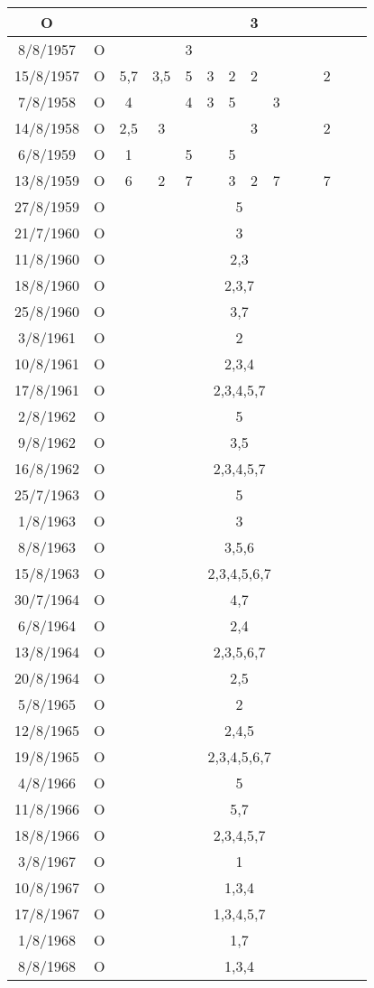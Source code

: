 \begin{longtable}{|c|c|c|c|c|c|c|c|c|c|c|c|c|c|}
	O &
	& & & & & & 3 & & & & &
	\tabularnewline
\hline
	8/8/1957	&
	O &
	& & 3 & & & & & & & & &
	\tabularnewline
\hline
	15/8/1957	 &
	O &
	5,7 & 3,5 & 5 & 3 & 2 & 2 & & & & 2 & &
	\tabularnewline
\hline
	7/8/1958	&
	O &
	4 & & 4 & 3 & 5 & & 3 & & & & &
	\tabularnewline
\hline
	14/8/1958	 &
	O &
	2,5 & 3 & & & & 3 & & & & 2 & &
	\tabularnewline
\hline
	6/8/1959	&
	O &
	1 & & 5 & & 5 & & & & & & &
	\tabularnewline
\hline
	13/8/1959	 &
	O &
	6 & 2 & 7 & & 3 & 2 & 7 & & & 7 & &
	\tabularnewline
\hline
	27/8/1959	 &
	O &
	\multicolumn{12}{c|}{5}
	\tabularnewline
\hline
	21/7/1960	 &
	O &
	\multicolumn{12}{c|}{3}
	\tabularnewline
\hline
	11/8/1960	 &
	O &
	\multicolumn{12}{c|}{2,3}
	\tabularnewline
\hline
	18/8/1960	 &
	O &
	\multicolumn{12}{c|}{2,3,7}
	\tabularnewline
\hline
	25/8/1960	 &
	O &
	\multicolumn{12}{c|}{3,7}
	\tabularnewline
\hline
	3/8/1961	&
	O &
	\multicolumn{12}{c|}{2}
	\tabularnewline
\hline
	10/8/1961	 &
	O &
	\multicolumn{12}{c|}{2,3,4}
	\tabularnewline
\hline
	17/8/1961 &
	O &
	\multicolumn{12}{c|}{2,3,4,5,7}
	\tabularnewline
\hline
	2/8/1962	&
	O &
	\multicolumn{12}{c|}{5}
	\tabularnewline
\hline
	9/8/1962	&
	O &
	\multicolumn{12}{c|}{3,5}
	\tabularnewline
\hline
	16/8/1962	 &
	O &
	\multicolumn{12}{c|}{2,3,4,5,7}
	\tabularnewline
\hline
	25/7/1963	 &
	O &
	\multicolumn{12}{c|}{5}
	\tabularnewline
\hline
	1/8/1963	&
	O &
	\multicolumn{12}{c|}{3}
	\tabularnewline
\hline
	8/8/1963	&
	O &
	\multicolumn{12}{c|}{3,5,6}
	\tabularnewline
\hline
	15/8/1963	 &
	O &
	\multicolumn{12}{c|}{2,3,4,5,6,7}
	\tabularnewline
\hline
	30/7/1964	 &
	O &
	\multicolumn{12}{c|}{4,7}
	\tabularnewline
\hline
	6/8/1964	&
	O &
	\multicolumn{12}{c|}{2,4}
	\tabularnewline
\hline
	13/8/1964	 &
	O &
	\multicolumn{12}{c|}{2,3,5,6,7}
	\tabularnewline
\hline
	20/8/1964	 &
	O &
	\multicolumn{12}{c|}{2,5}
	\tabularnewline
\hline
	5/8/1965	&
	O &
	\multicolumn{12}{c|}{2}
	\tabularnewline
\hline
	12/8/1965	 &
	O &
	\multicolumn{12}{c|}{2,4,5}
	\tabularnewline
\hline
	19/8/1965	 &
	O &
	\multicolumn{12}{c|}{2,3,4,5,6,7}
	\tabularnewline
\hline
	4/8/1966	&
	O &
	\multicolumn{12}{c|}{5}
	\tabularnewline
\hline
	11/8/1966	 &
	O &
	\multicolumn{12}{c|}{5,7}
	\tabularnewline
\hline
	18/8/1966	 &
	O &
	\multicolumn{12}{c|}{2,3,4,5,7}
	\tabularnewline
\hline
	3/8/1967	&
	O &
	\multicolumn{12}{c|}{1}
	\tabularnewline
\hline
	10/8/1967	 &
	O &
	\multicolumn{12}{c|}{1,3,4}
	\tabularnewline
\hline
	17/8/1967	 &
	O &
	\multicolumn{12}{c|}{1,3,4,5,7}
	\tabularnewline
\hline
	1/8/1968	&
	O &
	\multicolumn{12}{c|}{1,7}
	\tabularnewline
\hline
	8/8/1968	&
	O &
	\multicolumn{12}{c|}{1,3,4}
	\tabularnewline

\end{longtable}
